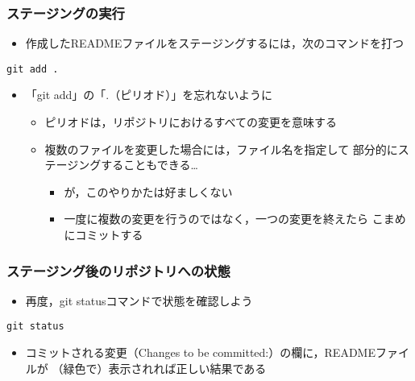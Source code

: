 \documentclass[a4paper,twoside,twocolumn]{bxjsarticle}
\begin{document}
\subsubsection{ステージングの実行}
\label{sec-1-3-5}
\begin{itemize}
\item 作成したREADMEファイルをステージングするには，次のコマンドを打つ
\end{itemize}

\begin{verbatim}
git add .
\end{verbatim}

\begin{itemize}
\item 「git add」の「.（ピリオド）」を忘れないように
\begin{itemize}
\item ピリオドは，リポジトリにおけるすべての変更を意味する
\item 複数のファイルを変更した場合には，ファイル名を指定して
部分的にステージングすることもできる…
\begin{itemize}
\item が，このやりかたは好ましくない
\item 一度に複数の変更を行うのではなく，一つの変更を終えたら
こまめにコミットする
\end{itemize}
\end{itemize}
\end{itemize}

\subsubsection{ステージング後のリポジトリへの状態}
\label{sec-1-3-6}
\begin{itemize}
\item 再度，git statusコマンドで状態を確認しよう
\end{itemize}

\begin{verbatim}
git status
\end{verbatim}

\begin{itemize}
\item コミットされる変更（Changes to be committed:）の欄に，READMEファイルが
（緑色で）表示されれば正しい結果である
\end{itemize}
\end{document}
